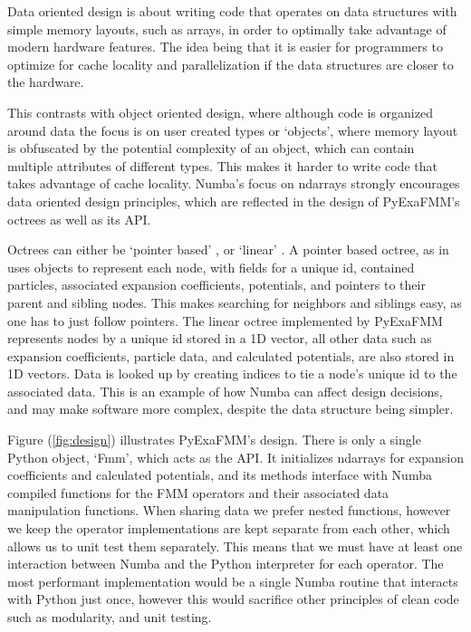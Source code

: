 \documentclass{IEEEcsmag}
\begin{document}
Data oriented design is about writing code that operates on data structures with simple memory layouts, such as arrays, in order to optimally take advantage of modern hardware features. The idea being that it is easier for programmers to optimize for cache locality and parallelization if the data structures are closer to the hardware.

This contrasts with object oriented design, where although code is organized around data the focus is on user created types or `objects', where memory layout is obfuscated by the potential complexity of an object, which can contain multiple attributes of different types. This makes it harder to write code that takes advantage of cache locality. Numba's focus on ndarrays strongly encourages data oriented design principles, which are reflected in the design of PyExaFMM's octrees as well as its API.

Octrees can either be `pointer based' \cite{Wang2021}, or `linear' \cite{Sundar2007}. A pointer based octree, as in uses objects to represent each node, with fields for a unique id, contained particles, associated expansion coefficients, potentials, and pointers to their parent and sibling nodes. This makes searching for neighbors and siblings easy, as one has to just follow pointers. The linear octree implemented by PyExaFMM represents nodes by a unique id stored in a 1D vector, all other data such as expansion coefficients, particle data, and calculated potentials, are also stored in 1D vectors. Data is looked up by creating indices to tie a node's unique id to the associated data. This is an example of how Numba can affect design decisions, and may make software more complex, despite the data structure being simpler.

Figure (\ref{fig:design}) illustrates PyExaFMM's design. There is only a single Python object, `Fmm', which acts as the API. It initializes ndarrays for expansion coefficients and calculated potentials, and its methods interface with Numba compiled functions for the FMM operators and their associated data manipulation functions. When sharing data we prefer nested functions, however we keep the operator implementations are kept separate from each other, which allows us to unit test them separately. This means that we must have at least one interaction between Numba and the Python interpreter for each operator. The most performant implementation would be a single Numba routine that interacts with Python just once, however this would sacrifice other principles of clean code such as modularity, and unit testing.
\end{document}
